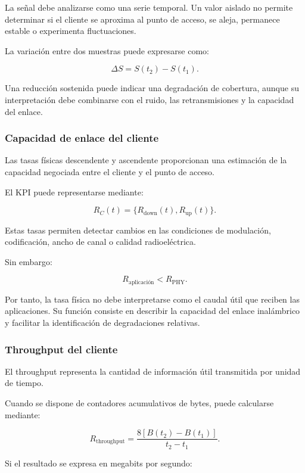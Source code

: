 La señal debe analizarse como una serie temporal. Un valor aislado no
permite determinar si el cliente se aproxima al punto de acceso, se
aleja, permanece estable o experimenta fluctuaciones.

La variación entre dos muestras puede expresarse como:

\[
    \Delta S
    =
    S(t_2)
    -
    S(t_1).
\]

Una reducción sostenida puede indicar una degradación de cobertura,
aunque su interpretación debe combinarse con el ruido, las
retransmisiones y la capacidad del enlace.


\subsubsection*{Capacidad de enlace del cliente}

Las tasas físicas descendente y ascendente proporcionan una estimación de
la capacidad negociada entre el cliente y el punto de acceso.

El KPI puede representarse mediante:

\[
    R_C(t)
    =
    \{
        R_{\mathrm{down}}(t),
        R_{\mathrm{up}}(t)
    \}.
\]

Estas tasas permiten detectar cambios en las condiciones de modulación,
codificación, ancho de canal o calidad radioeléctrica.

Sin embargo:

\[
    R_{\mathrm{aplicación}}
    <
    R_{\mathrm{PHY}}.
\]

Por tanto, la tasa física no debe interpretarse como el caudal útil que
reciben las aplicaciones. Su función consiste en describir la capacidad
del enlace inalámbrico y facilitar la identificación de degradaciones
relativas.


\subsubsection*{Throughput del cliente}

El throughput representa la cantidad de información útil transmitida por
unidad de tiempo.

Cuando se dispone de contadores acumulativos de bytes, puede calcularse
mediante:

\[
    R_{\mathrm{throughput}}
    =
    \frac{
        8
        \left[
            B(t_2)
            -
            B(t_1)
        \right]
    }{
        t_2
        -
        t_1
    }.
\]

Si el resultado se expresa en megabits por segundo:

